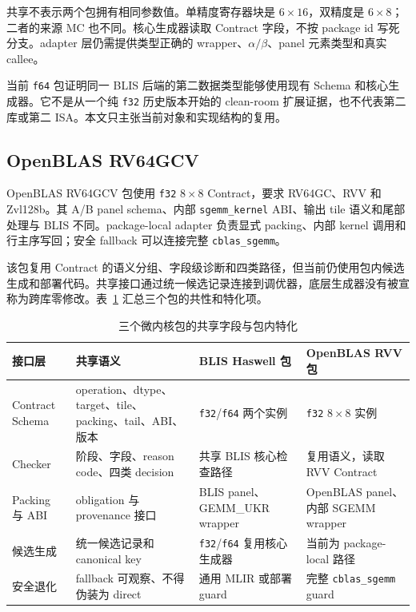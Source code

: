 共享不表示两个包拥有相同参数值。单精度寄存器块是 $6\times16$，双精度是 $6\times8$；二者的来源 MC 也不同。核心生成器读取 Contract 字段，不按 package id 写死分支。adapter 层仍需提供类型正确的 wrapper、$\alpha/\beta$、panel 元素类型和真实 callee。

当前 \texttt{f64} 包证明同一 BLIS 后端的第二数据类型能够使用现有 Schema 和核心生成器。它不是从一个纯 \texttt{f32} 历史版本开始的 clean-room 扩展证据，也不代表第二库或第二 ISA。本文只主张当前对象和实现结构的复用。

\subsection{OpenBLAS RV64GCV}

OpenBLAS RV64GCV 包使用 \texttt{f32} $8\times8$ Contract，要求 RV64GC、RVV 和 Zvl128b。其 A/B panel schema、内部 \texttt{sgemm\_kernel} ABI、输出 tile 语义和尾部处理与 BLIS 不同。package-local adapter 负责显式 packing、内部 kernel 调用和行主序写回；安全 fallback 可以连接完整 \texttt{cblas\_sgemm}。

该包复用 Contract 的语义分组、字段级诊断和四类路径，但当前仍使用包内候选生成和部署代码。共享接口通过统一候选记录连接到调优器，底层生成器没有被宣称为跨库零修改。表~\ref{tab:chapter3-package-boundary} 汇总三个包的共性和特化项。

\begin{table}[!htbp]
  \centering
  \caption{三个微内核包的共享字段与包内特化}
  \label{tab:chapter3-package-boundary}
  \begingroup
  \begin{tabularx}{\textwidth}{
    @{}
    >{\raggedright\arraybackslash}p{}
    >{\raggedright\arraybackslash}p{}
    >{\raggedright\arraybackslash}p{}
    >{\raggedright\arraybackslash}X
    @{}
  }
    \toprule
    \textbf{接口层} & \textbf{共享语义} & \textbf{BLIS Haswell 包} &
    \textbf{OpenBLAS RVV 包} \\
    \midrule
    Contract Schema &
    operation、dtype、target、tile、packing、tail、ABI、版本 &
    \texttt{f32}/\texttt{f64} 两个实例 &
    \texttt{f32} $8\times8$ 实例 \\
    Checker &
    阶段、字段、reason code、四类 decision &
    共享 BLIS 核心检查路径 &
    复用语义，读取 RVV Contract \\
    Packing 与 ABI &
    obligation 与 provenance 接口 &
    BLIS panel、GEMM\_UKR wrapper &
    OpenBLAS panel、内部 SGEMM wrapper \\
    候选生成 &
    统一候选记录和 canonical key &
    \texttt{f32}/\texttt{f64} 复用核心生成器 &
    当前为 package-local 路径 \\
    安全退化 &
    fallback 可观察、不得伪装为 direct &
    通用 MLIR 或部署 guard &
    完整 \texttt{cblas\_sgemm} guard \\
    \bottomrule
  \end{tabularx}
  \endgroup
\end{table}

